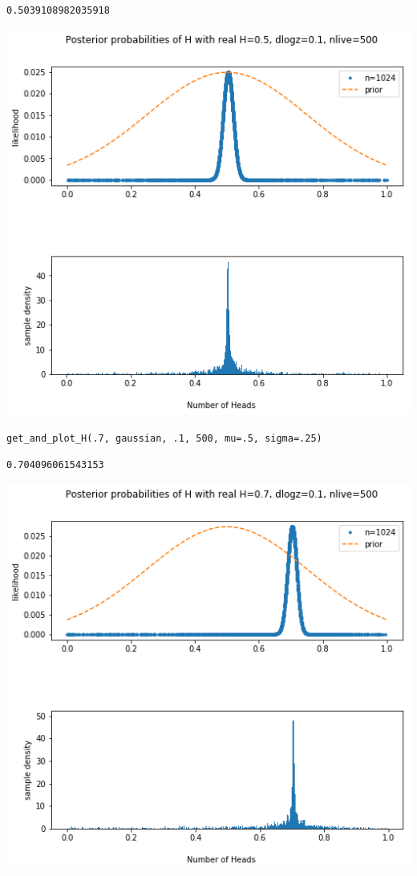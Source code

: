 \documentclass[11pt]{article}
\begin{document}
\begin{verbatim}
0.5039108982035918
\end{verbatim}
\includegraphics[width=.9\linewidth]{./obipy-resources/6926Xz.png}

\begin{verbatim}
get_and_plot_H(.7, gaussian, .1, 500, mu=.5, sigma=.25)
\end{verbatim}

\begin{verbatim}
0.704096061543153
\end{verbatim}
\includegraphics[width=.9\linewidth]{./obipy-resources/692shC.png}
\end{document}

